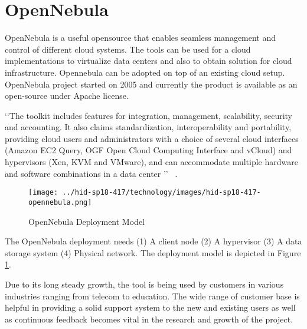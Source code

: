 
\section{OpenNebula}

OpenNebula is a useful opensource that enables seamless management and
control of different cloud systems.  The tools can be used for a cloud
implementations to virtualize data centers and also to obtain solution
for cloud infrastructure.  Opennebula can be adopted on top of an
existing cloud setup.  OpenNebula project started on 2005 and
currently the product is available as an open-source under Apache
license.

‘‘The toolkit includes features for integration, management,
scalability, security and accounting.  It also claims standardization,
interoperability and portability, providing cloud users and
administrators with a choice of several cloud interfaces (Amazon EC2
Query, OGF Open Cloud Computing Interface and vCloud) and hypervisors
(Xen, KVM and VMware), and can accommodate multiple hardware and
software combinations in a data center ’’
~\cite{hid-sp18-417-opennebula-wiki}.

\begin{figure}[htb]
\texttt{[image: ../hid-sp18-417/technology/images/hid-sp18-417-opennebula.png]}
\caption{OpenNebula Deployment Model ~\cite{hid-sp18-417-opennebula-deployment}} 
\label{F:opennebula}
\end{figure}

The OpenNebula deployment needs (1) A client node (2) A hypervisor (3)
A data storage system (4) Physical network. The deployment model is
depicted in Figure \ref{F:opennebula}.

Due to its long steady growth, the tool is being used by customers in
various industries ranging from telecom to education.  The wide range
of customer base is helpful in providing a solid support system to the
new and existing users as well as continuous feedback becomes vital in
the research and growth of the project.

